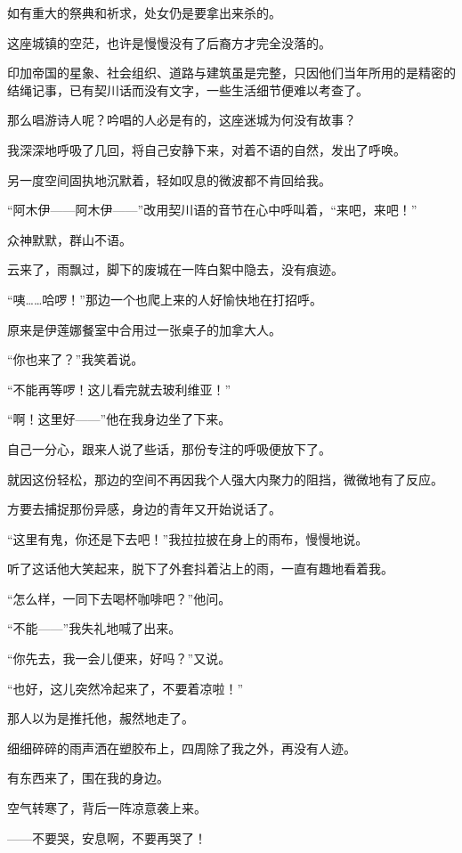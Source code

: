 \par 如有重大的祭典和祈求，处女仍是要拿出来杀的。
\par 这座城镇的空茫，也许是慢慢没有了后裔方才完全没落的。
\par 印加帝国的星象、社会组织、道路与建筑虽是完整，只因他们当年所用的是精密的结绳记事，已有契川话而没有文字，一些生活细节便难以考查了。
\par 那么唱游诗人呢？吟唱的人必是有的，这座迷城为何没有故事？
\par 我深深地呼吸了几回，将自己安静下来，对着不语的自然，发出了呼唤。
\par 另一度空间固执地沉默着，轻如叹息的微波都不肯回给我。
\par “阿木伊——阿木伊——”改用契川语的音节在心中呼叫着，“来吧，来吧！”
\par 众神默默，群山不语。
\par 云来了，雨飘过，脚下的废城在一阵白絮中隐去，没有痕迹。
\par “咦……哈啰！”那边一个也爬上来的人好愉快地在打招呼。
\par 原来是伊莲娜餐室中合用过一张桌子的加拿大人。
\par “你也来了？”我笑着说。
\par “不能再等啰！这儿看完就去玻利维亚！”
\par “啊！这里好——”他在我身边坐了下来。
\par 自己一分心，跟来人说了些话，那份专注的呼吸便放下了。
\par 就因这份轻松，那边的空间不再因我个人强大内聚力的阻挡，微微地有了反应。
\par 方要去捕捉那份异感，身边的青年又开始说话了。
\par “这里有鬼，你还是下去吧！”我拉拉披在身上的雨布，慢慢地说。
\par 听了这话他大笑起来，脱下了外套抖着沾上的雨，一直有趣地看着我。
\par “怎么样，一同下去喝杯咖啡吧？”他问。
\par “不能——”我失礼地喊了出来。
\par “你先去，我一会儿便来，好吗？”又说。
\par “也好，这儿突然冷起来了，不要着凉啦！”
\par 那人以为是推托他，赧然地走了。
\par 细细碎碎的雨声洒在塑胶布上，四周除了我之外，再没有人迹。
\par 有东西来了，围在我的身边。
\par 空气转寒了，背后一阵凉意袭上来。
\par ——不要哭，安息啊，不要再哭了！
